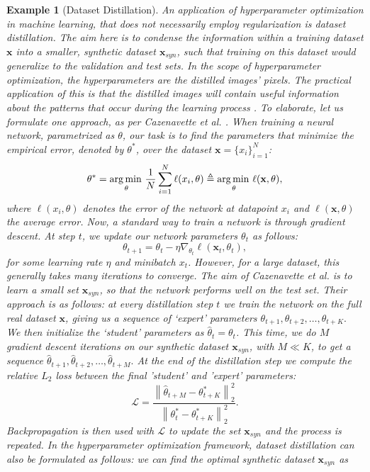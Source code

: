 \documentclass[11pt, twoside]{report}
\newtheorem{example}[theorem]{Example}
\begin{document}
\begin{example}[Dataset Distillation]
    An application of hyperparameter optimization in machine learning, that does not necessarily employ regularization is {\em dataset distillation}. The aim here is to condense the information within a training dataset $\mathbf{x}$ into a smaller, synthetic dataset $\mathbf{x}_{syn}$, such that training on this dataset would generalize to the validation and test sets. In the scope of hyperparameter optimization, the hyperparameters are the distilled images' pixels. The practical application of this is that the distilled images will contain useful information about the patterns that occur during the learning process \cite{lorraine2020optimizing}. To elaborate, let us formulate one approach, as per Cazenavette et al. \cite{cazenavette2022dataset}. When training a neural network, parametrized as $\theta$, our task is to find the parameters that minimize the empirical error, denoted by $\theta^*$, over the dataset $\mathbf{x} = \{x_i\}_{i=1}^N$:
\[\theta^* = \operatorname*{arg\, min \,}_\theta \frac{1}{N} \sum_{i=1}^N \ell(x_i,\theta) \triangleq \operatorname*{arg\, min \,}_\theta \ell(\mathbf{x},\theta),\]
where $\ell(x_i,\theta)$ denotes the error of the network at datapoint $x_i$ and $\ell(\mathbf{x},\theta)$ the average error. Now, a standard way to train a network is through gradient descent. At step $t$, we update our network parameters $\theta_t$ as follows:
\[\theta_{t+1} = \theta_t - \eta \nabla_{\theta_t} \ell(\mathbf{x}_t,\theta_t),\]
for some learning rate $\eta$ and minibatch $x_t$. However, for a large dataset, this generally takes many iterations to converge. The aim of Cazenavette et al. is to learn a small set $\mathbf{x}_{syn}$, so that the network performs well on the test set. Their approach is as follows: at every distillation step $t$ we train the network on the full real dataset $\mathbf{x}$, giving us a sequence of `expert' parameters $\theta_{t+1}, \theta_{t+2}, \hdots, \theta_{t+K}.$ We then initialize the `student' parameters as $\hat{\theta}_t = \theta_t$. This time, we do $M$ gradient descent iterations on our synthetic dataset $\mathbf{x}_{syn}$, with $M \ll K$, to get a sequence $\hat{\theta}_{t+1}, \hat{\theta}_{t+2}, \hdots, \hat{\theta}_{t+M}.$ At the end of the distillation step we compute the relative $L_2$ loss between the final 'student' and 'expert' parameters:
\[\mathcal{L}=\frac{\left\|\hat{\theta}_{t+M}-\theta_{t+K}^*\right\|_2^2}{\left\|\theta_t^*-\theta_{t+K}^*\right\|_2^2}.\]
Backpropagation is then used with $\mathcal{L}$ to update the set $\mathbf{x}_{syn}$ and the process is repeated. In the hyperparameter optimization framework, dataset distillation can also be formulated as follows: we can find the optimal synthetic dataset $\mathbf{x}_{syn}$ as

\end{example}
\end{document}
